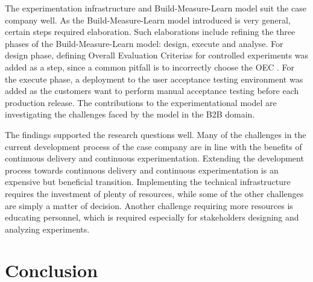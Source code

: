 \documentclass[english, grading]{tktltiki2}
\theoremstyle{definition}
\theoremstyle{remark}
\begin{document}
The experimentation infrastructure and Build-Measure-Learn model \cite{fagerholm2014building} suit the case company well. As the Build-Measure-Learn model introduced is very general, certain steps required elaboration. Such elaborations include refining the three phases of the Build-Measure-Learn model: design, execute and analyse. For design phase, defining Overall Evaluation Criterias for controlled experiments was added as a step, since a common pitfall is to incorrectly choose the OEC \cite{crook2009seven}. For the execute phase, a deployment to the user acceptance testing environment was added as the customers want to perform manual acceptance testing before each production release. The contributions to the experimentational model are investigating the challenges faced by the model in the B2B domain. 

The findings supported the research questions well. Many of the challenges in the current development process of the case company are in line with the benefits of continuous delivery and continuous experimentation. Extending the development process towards continuous delivery and continuous experimentation is an expensive but beneficial transition. Implementing the technical infrastructure requires the investment of plenty of resources, while some of the other challenges are simply a matter of decision. Another challenge requiring more resources is educating personnel, which is required especially for stakeholders designing and analyzing experiments.

\section{Conclusion}
\end{document}
